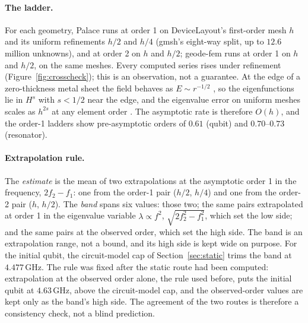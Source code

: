 \documentclass{anvil-paper}
\begin{document}
\paragraph{The ladder.}
For each geometry, Palace runs at order 1 on DeviceLayout's first-order
mesh $h$ and its uniform refinements $h/2$ and $h/4$ (gmsh's eight-way
split, up to $12.6$ million unknowns), and at order 2 on $h$ and $h/2$;
geode-fem runs at order 1 on $h$ and $h/2$, on the same meshes. Every
computed series rises under refinement (Figure~\ref{fig:crosscheck}); this
is an observation, not a guarantee. At the edge of a zero-thickness metal
sheet the field behaves as $E \sim r^{-1/2}$ \citep{meixner1972behavior},
so the eigenfunctions lie in $H^{s}$ with $s < 1/2$ near the edge, and the
eigenvalue error on uniform meshes scales as $h^{2s}$ at any element order
\citep{boffi2010finite}. The asymptotic rate is therefore $O(h)$, and the
order-1 ladders show pre-asymptotic orders of $0.61$ (qubit) and
$0.70$--$0.73$ (resonator).

\paragraph{Extrapolation rule.}
The \emph{estimate} is the mean of two extrapolations at the asymptotic
order 1 in the frequency, $2f_2 - f_1$: one from the order-1 pair
($h/2$, $h/4$) and one from the order-2 pair ($h$, $h/2$). The
\emph{band} spans six values: those two; the same pairs extrapolated at
order 1 in the eigenvalue variable $\lambda\propto f^2$,
$\sqrt{2f_2^2 - f_1^2}$, which set the low side; and the same pairs at the
observed order, which set the high side. The band is an extrapolation
range, not a bound, and its high side is kept wide on purpose. For the
initial qubit, the circuit-model cap of Section~\ref{sec:static} trims the
band at $4.477$\,GHz. The rule was fixed after the static route had been
computed: extrapolation at the observed order alone, the rule used
before, puts the initial qubit at $4.63$\,GHz, above the circuit-model cap,
and the observed-order values are kept only as the band's high side. The
agreement of the two routes is therefore a consistency check, not a blind
prediction.
\end{document}
